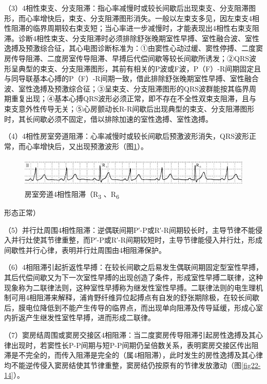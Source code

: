 （3）4相性束支、分支阻滞：指心率减慢时或较长间歇后出现束支、分支阻滞图形，而心率增快后，束支、分支阻滞图形消失。一般以左束支多见，因左束支4相性阻滞的临界周期较右束支短；当心率进一步减慢时，才能表现出4相性右束支阻滞。诊断4相性束支、分支阻滞时必须排除舒张晚期室性早搏、室性融合波、室性逸搏及预激综合征，其心电图诊断标准为：①由窦性心动过缓、窦性停搏、二度窦房传导阻滞、二度房室传导阻滞、早搏后代偿间歇等较长间歇所诱发；②QRS波形呈典型的束支、分支阻滞图形，其前有相关的P波或F波，P（F）-R间期固定且与同导联基本心搏的P（F）-R间期一致，借此排除舒张晚期室性早搏、室性融合波、室性逸搏及预激综合征；③呈束支、分支阻滞图形的QRS波群能按其临界周期重复出现；④基本心搏QRS波形必须正常，即不存在不全性双束支阻滞，且与束支意外性传导无关；⑤心房颤动长R-R间歇后出现典型的束支、分支阻滞图形时，其长间歇必须不固定，借以排除加速的室性逸搏、室性逸搏。

（4）4相性房室旁道阻滞：心率减慢时或较长间歇后预激波形消失，QRS波形正常，而心率增快后，又出现预激波形（图\ref{fig22-13}）。

\begin{figure}[!htbp]
 \centering
 \includegraphics[width=5.60417in,height=0.57292in]{./images/Image00379.jpg}
 \captionsetup{justification=centering}
 \caption{房室旁道4相性阻滞（R\textsubscript{3} 、R\textsubscript{6}}
 \label{fig22-13}
  \end{figure} 
形态正常）

（5）并行灶周围4相性阻滞：逆偶联间期P′-P或R′-R间期较长时，主导节律不能侵入并行灶使其节律重整，而P′-P或R′-R间期较短时，主导节律能侵入并行灶，形成间歇性并行心律，表明并行灶周围由4相阻滞保护。

（6）4相阻滞引起折返性早搏：在较长间歇之后易发生偶联间期固定型室性早搏，其后代偿间歇又为下一次室性早搏的出现创造了条件，形成室性早搏二联律，这种现象称为二联律法则，这种室性早搏称为继发性室性早搏。二联律法则的电生理机制可用4相阻滞来解释，浦肯野纤维异位起搏点有自发的舒张期除极，在较长间歇后，膜电位降低到不能产生传导的临界点，而出现单向阻滞及传导延缓，形成心室内折返产生继发性室性早搏，进而形成二联律。

（7）窦房结周围或窦房交接区4相阻滞：当二度窦房传导阻滞引起房性逸搏及其心律出现时，若窦性长P-P间期与短P-P间期仍呈倍数关系，表明窦房交接区传出阻滞是不完全的，而传入阻滞是完全的（属4相阻滞），此时发生的房性逸搏及其心律均不能逆传侵入窦房结使其节律重整，窦房结仍按原有的节律发放激动（图\ref{fig22-14}）。

